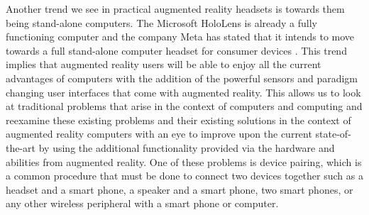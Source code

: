 \documentclass[12pt]{report}
\begin{document}
Another trend we see in practical augmented reality headsets is towards them being stand-alone computers. The Microsoft HoloLens is already a fully functioning computer and the company Meta has stated that it intends to move towards a full stand-alone computer headset for consumer devices \cite{MetaWebsite}. This trend implies that augmented reality users will be able to enjoy all the current advantages of computers with the addition of the powerful sensors and paradigm changing user interfaces that come with augmented reality. This allows us to look at traditional problems that arise in the context of computers and computing and reexamine these existing problems and their existing solutions in the context of augmented reality computers with an eye to improve upon the current state-of-the-art by using the additional functionality provided via the hardware and abilities from augmented reality. One of these problems is device pairing, which is a common procedure that must be done to connect two devices together such as a headset and a smart phone, a speaker and a smart phone, two smart phones, or any other wireless peripheral with a smart phone or computer. \par
\end{document}
